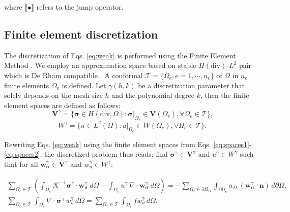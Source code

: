 \documentclass{wccm2024}
\begin{document}
\noindent where $\llbracket \bullet \rrbracket$ refers to the jump operator.

\subsection{Finite element discretization}

The discretization of Eqs. \eqref{eq:weak} is performed using the Finite Element Method \cite{becker1981finite}. We employ an approximation space based on stable $H(\text{div})$-$L^2$ pair which is De Rham compatible \cite{devloo2022efficient,de2013new}. A conformal $\mathcal{T}=\{\Omega_e,e=1, \cdots, n_e \}$ of $\Omega$ in $n_e$ finite elements $\Omega_e$ is defined. Let $\gamma(h,k)$ be a discretization parameter that solely depends on the mesh size $h$ and the polynomial degree $k$, then the finite element spaces are defined as follows:
\vskip -0.3cm
\begin{equation} \label{eq:spaces1}
    \mathbf{V}^\gamma = \{ \boldsymbol{\sigma} \in H(\text{div},\Omega) : \boldsymbol{\sigma}|_{\Omega_e} \in \mathbf{V}(\Omega_e), \forall \Omega_e \in \mathcal{T} \} \text{,}
\end{equation}
\vskip -0.3cm
\begin{equation} \label{eq:spaces2}
    W^\gamma = \{ u \in L^2(\Omega) : u|_{\Omega_e} \in W(\Omega_e), \forall \Omega_e \in \mathcal{T} \} \text{.}
\end{equation}

Rewriting Eqs. \eqref{eq:weak} using the finite element spaces from Eqs. \eqref{eq:spaces1}-\eqref{eq:spaces2}, the discretized problem thus reads: find $\boldsymbol{\sigma}^\gamma \in \mathbf{V}^\gamma$ and $u^\gamma \in W^\gamma$ such that for all $\mathbf{w}_{\boldsymbol{\sigma}}^\gamma \in \mathbf{V}^\gamma$ and $w_u^\gamma \in W^\gamma$:

\begin{equation} \label{eq:discrete}
    \begin{split}
        \sum_{\Omega_e \in \mathcal{T}} \left(\int_{\Omega_e} \mathcal{K}^{-1}\boldsymbol{\sigma}^\gamma \cdot \mathbf{w}_{\boldsymbol{\sigma}}^\gamma \, d\Omega - \int_{\Omega_e} u^\gamma \, \nabla \cdot \mathbf{w}_{\boldsymbol{\sigma}}^\gamma \, d\Omega \right)=- \sum_{\Omega_e \in \partial\Omega_D} \int_{\partial\Omega_e} u_D \ (\mathbf{w}^\gamma_{\boldsymbol{\sigma}} \cdot \mathbf{n}) \, d\partial\Omega, \\
        \sum_{\Omega_e \in \mathcal{T}} \int_{\Omega_e} \nabla \cdot \boldsymbol{\sigma}^\gamma \, w_u^\gamma \, d\Omega = \sum_{\Omega_e \in \mathcal{T}} \int_{\Omega_e} f w_u^\gamma \, d\Omega.
    \end{split}
\end{equation}
\end{document}
